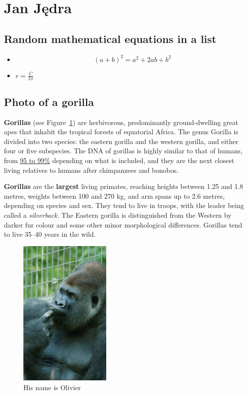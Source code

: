 \newpage
\section{Jan Jędra}
\label{sec:jjedra}

\subsection{Random mathematical equations in a list}
\begin{itemize}
\centering
    \item \[(a+b)^2=a^2+2ab+b^2\]
    \item $ r=\frac{C}{2\pi}$
\end{itemize}

\subsection{Photo of a gorilla}

\begin{flushleft}
\textbf{Gorillas} (see Figure~\ref{fig:gorilla}) are herbivorous, predominantly ground-dwelling great apes that inhabit the tropical forests of equatorial Africa. The genus Gorilla is divided into two species: the eastern gorilla and the western gorilla, and either four or five subspecies. The DNA of gorillas is highly similar to that of humans, from \underline{95 to 99\%} depending on what is included, and they are the next closest living relatives to humans after chimpanzees and bonobos.\par
\textbf{Gorillas} are the \textbf{largest} living primates, reaching heights between 1.25 and 1.8 metres, weights between 100 and 270 kg, and arm spans up to 2.6 metres, depending on species and sex. They tend to live in troops, with the leader being called a \textit{silverback}. The Eastern gorilla is distinguished from the Western by darker fur colour and some other minor morphological differences. Gorillas tend to live 35–40 years in the wild.
\end{flushleft}
\begin{figure}[htbp]
    \centering
    \includegraphics[width=0.4\textwidth]{pictures/gorilla.jpg}
    \caption{His name is Olivier}
    \label{fig:gorilla}
\end{figure}

